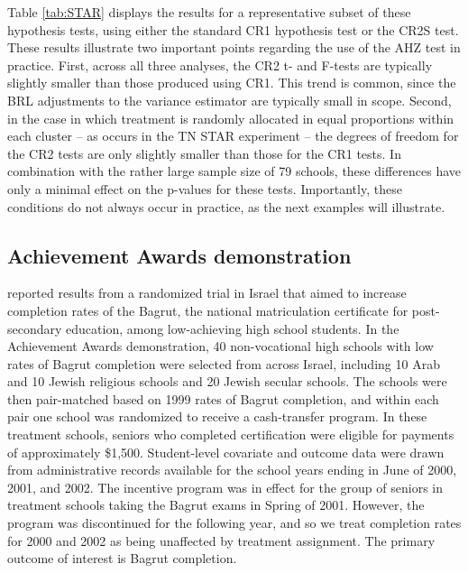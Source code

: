 \documentclass[12pt]{article}\usepackage[]{graphicx}\usepackage[]{color}
\begin{document}
Table \ref{tab:STAR} displays the results for a representative subset of these hypothesis tests, using either the standard CR1 hypothesis test or the CR2S test.
These results illustrate two important points regarding the use of the AHZ test in practice.
First, across all three analyses, the CR2 t- and F-tests are typically slightly smaller than those produced using CR1. 
This trend is common, since the BRL adjustments to the variance estimator are typically small in scope.
Second, in the case in which treatment is randomly allocated in equal proportions within each cluster -- as occurs in the TN STAR experiment -- the degrees of freedom for the CR2 tests are only slightly smaller than those for the CR1 tests. 
In combination with the rather large sample size of 79 schools, these differences have only a minimal effect on the p-values for these tests. 
Importantly, these conditions do not always occur in practice, as the next examples will illustrate. 

\subsection{Achievement Awards demonstration} 

\citet{Angrist2009effects} reported results from a randomized trial in Israel that aimed to increase completion rates of the Bagrut, the national matriculation certificate for post-secondary education, among low-achieving high school students. 
In the Achievement Awards demonstration, 40 non-vocational high schools with low rates of Bagrut completion were selected from across Israel, including 10 Arab and 10 Jewish religious schools and 20 Jewish secular schools. 
The schools were then pair-matched based on 1999 rates of Bagrut completion, and within each pair one school was randomized to receive a cash-transfer program. 
In these treatment schools, seniors who completed certification were eligible for payments of approximately \$1,500. 
Student-level covariate and outcome data were drawn from administrative records available for the school years ending in June of 2000, 2001, and 2002. 
The incentive program was in effect for the group of seniors in treatment schools taking the Bagrut exams in Spring of 2001. 
However, the program was discontinued for the following year, and so we treat completion rates for 2000 and 2002 as being unaffected by treatment assignment.
The primary outcome of interest is Bagrut completion. 
\end{document}
